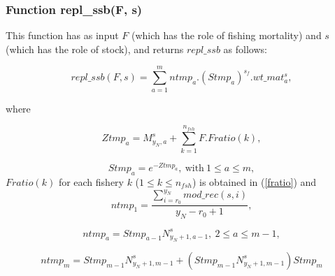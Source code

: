 \documentclass{article}
\begin{document}
\subsubsection{Function repl\_ssb(F, s)} \label{replssb}
This function has as input $F$ (which has the role of fishing mortality) and $s$ (which has the role of stock), and returns $repl\_ssb$ as follows:

\begin{equation}
    repl\_ssb(F,s)=\sum_{a=1}^m ntmp_a .(Stmp_a)^{s_f} . wt\_mat^s_a,
\end{equation}

where

\begin{equation}
    Ztmp_a=M^s_{y_{N},a}+\sum_{k=1}^{n_{fsh}}F.Fratio(k),
\end{equation}

\begin{equation}
    Stmp_a=e^{-Ztmp_a}, \ \text{with} \ 1\leq a \leq m,
\end{equation}
 $Fratio(k)$ for each fishery $k$ ($1\leq k \leq n_{fsh}$) is obtained in (\ref{fratio})
and
\begin{equation}
    ntmp_1 = \dfrac{\displaystyle\sum_{i=r_0}^{y_N} {mod\_rec}(s,i)}{{y_N}-r_0+1},
\end{equation}

\begin{equation}
    ntmp_a=Stmp_{a-1}N^s_{y_N+1,{a-1}}, \ 2\leq a\leq m-1,
\end{equation}

\begin{equation}
    ntmp_{m}=Stmp_{m-1}N^s_{y_N+1,m-1}+(Stmp_{m-1}N^s_{y_N+1,m-1})Stmp_{m}
\end{equation}
\end{document}
